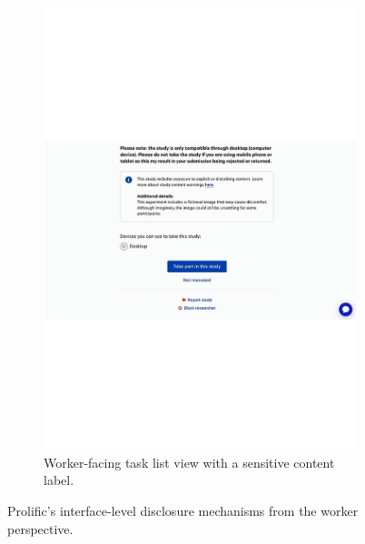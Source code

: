 \begin{figure}[ht]
\begin{subfigure}[b]{0.48\linewidth}
    \includegraphics[width=\linewidth]{figures/prolific_worker_side_example.pdf}
    \caption{Worker-facing task list view with a sensitive content label.}
    \label{fig:prolific_worker}
  \end{subfigure}
  \caption{Prolific’s interface-level disclosure mechanisms from the worker perspective.}
  \label{fig:prolific_worker_pair}
\end{figure}

